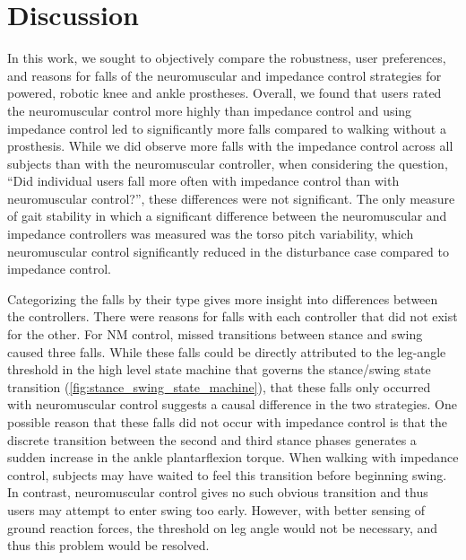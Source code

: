 \section{Discussion}

In this work, we sought to objectively compare the robustness, user preferences,
and reasons for falls of the neuromuscular and impedance control strategies for
powered, robotic knee and ankle prostheses. Overall, we found that users rated
the neuromuscular control more highly than impedance control and using impedance
control led to significantly more falls compared to walking without a
prosthesis. While we did observe more falls with the impedance control across
all subjects than with the neuromuscular controller, when considering the
question, ``Did individual users fall more often with impedance control than
with neuromuscular control?'', these differences were not significant. The only
measure of gait stability in which a significant difference between the
neuromuscular and impedance controllers was measured was the torso pitch
variability, which neuromuscular control significantly reduced in the
disturbance case compared to impedance control.

Categorizing the falls by their type gives more insight into differences between
the controllers. There were reasons for falls with each controller that did not
exist for the other. For NM control, missed transitions between stance and swing
caused three falls. While these falls could be directly attributed to the
leg-angle threshold in the high level state machine that governs the
stance/swing state transition (\cref{fig:stance_swing_state_machine}), that
these falls only occurred with neuromuscular control suggests a causal
difference in the two strategies. One possible reason that these falls did not
occur with impedance control is that the discrete transition between the second
and third stance phases generates a sudden increase in the ankle plantarflexion
torque. When walking with impedance control, subjects may have waited to feel
this transition before beginning swing. In contrast, neuromuscular control gives
no such obvious transition and thus users may attempt to enter swing too early.
However, with better sensing of ground reaction forces, the threshold on leg
angle would not be necessary, and thus this problem would be resolved.

